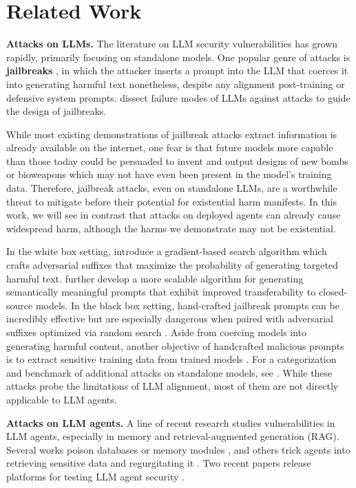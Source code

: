 \section{Related Work}
\label{sec:related}

\textbf{Attacks on LLMs.} The literature on LLM security vulnerabilities has grown rapidly, primarily focusing on standalone models. One popular genre of attacks is \textbf{jailbreaks} \cite{wei2024jailbroken, huang2023catastrophic}, in which the attacker inserts a prompt into the LLM that coerces it into generating harmful text nonetheless, despite any alignment post-training or defensive system prompts. \citet{wei2024jailbroken} dissect failure modes of LLMs against attacks to guide the design of jailbreaks.

While most existing demonstrations of jailbreak attacks extract information is already available on the internet, one fear is that future models more capable than those today could be persuaded to invent and output designs of new bombs or bioweapons which may not have even been present in the model's training data.  Therefore, jailbreak attacks, even on standalone LLMs, are a worthwhile threat to mitigate before their potential for existential harm manifests.  In this work, we will see in contrast that attacks on deployed agents can already cause widespread harm, although the harms we demonstrate may not be existential.

In the white box setting, \citet{zou2023universal} introduce a gradient-based search algorithm which crafts adversarial suffixes that maximize the probability of generating targeted harmful text. \citet{liuautodan} further develop a more scalable algorithm for generating semantically meaningful prompts that exhibit improved transferability to closed-source models. In the black box setting, hand-crafted jailbreak prompts can be incredibly effective but are especially dangerous when paired with adversarial suffixes optimized via random search \citep{andriushchenko2024jailbreaking}. Aside from coercing models into generating harmful content, another objective of handcrafted malicious prompts is to extract sensitive training data from trained models \citep{nasr2023scalable}.  For a categorization and benchmark of additional attacks on standalone models, see \citet{shen2024anything}.  While these attacks probe the limitations of LLM alignment, most of them are not directly applicable to LLM agents.
 

\textbf{Attacks on LLM agents.} A line of recent research studies vulnerabilities in LLM agents, especially in memory and retrieval-augmented generation (RAG).  Several works poison databases or memory modules \citep{zhang2024breaking, yang2024watch, chen2024agentpoisonredteamingllmagents, zou2024poisonedrag}, and others trick agents into retrieving sensitive data and regurgitating it \citep{zeng2024good}. Two recent papers release platforms for testing LLM agent security \citep{debenedetti2024agentdojodynamicenvironmentevaluate, andriushchenko2024agentharm}. 

